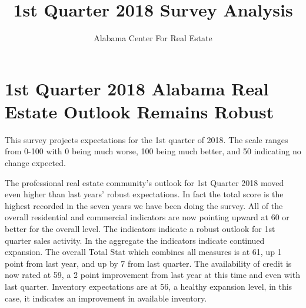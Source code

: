 \documentclass[11pt]{article}
\title{1st Quarter 2018 Survey Analysis}
\author{Alabama Center For Real Estate}
\begin{document}
    
    
    \maketitle
    
    

    \pagestyle{plain}
\iffalse
    http://nbviewer.ipython.org/7175353


    \begin{Verbatim}[commandchars=\\\{\}]
/home/tom/anaconda3/envs/py36n/lib/python3.6/site-packages/statsmodels/compat/pandas.py:56: FutureWarning: The pandas.core.datetools module is deprecated and will be removed in a future version. Please use the pandas.tseries module instead.
  from pandas.core import datetools

    \end{Verbatim}

    \begin{Verbatim}[commandchars=\\\{\}]
<class 'pandas.core.frame.DataFrame'>
RangeIndex: 14465 entries, 0 to 14464
Data columns (total 11 columns):
City             14465 non-null object
region           14465 non-null object
Res\_Comm         14465 non-null object
mkt\_type         14465 non-null object
Quradate         14377 non-null datetime64[ns]
National\_exp     14377 non-null float64
Alabama\_exp      14377 non-null float64
Sales\_exp        14377 non-null float64
Inventory\_exp    14377 non-null float64
Price\_exp        14377 non-null float64
Credit\_exp       14377 non-null float64
dtypes: datetime64[ns](1), float64(6), object(4)
memory usage: 1.2+ MB

    \end{Verbatim}

\fi 
    \section{1st Quarter 2018 Alabama Real Estate Outlook Remains
Robust}\label{st-quarter-2018-alabama-real-estate-outlook-remains-robust}
This survey projects expectations for the 1st quarter of 2018. The scale ranges from 0-100 with 0 being much worse, 100 being much better, and 50 indicating no change expected.  \newline 
  
The professional real estate community's outlook for 1st Quarter 2018 moved even higher than last years' robust expectations. In fact the total score is the highest recorded in the seven years we have been doing the survey. All of the overall residential and commercial indicators are now pointing upward at 60 or better for the overall level. The indicators indicate a robust outlook for 1st quarter sales activity. In the aggregate the indicators indicate continued expansion. The overall Total Stat which combines all measures is at 61, up 1 point from last year, and up by 7 from last quarter. The availability of credit is now rated at 59, a 2 point improvement from last year at this time and even with last quarter. Inventory expectations are at 56, a healthy expansion level, in this case, it indicates an improvement in available inventory.
\end{document}
